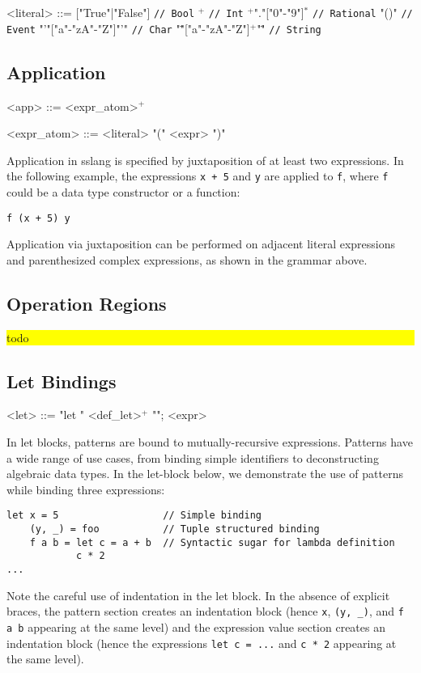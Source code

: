 \documentclass{article}
\newcommand{\fixme}[1]{
  \noindent\colorbox{yellow}{\parbox{\dimexpr\linewidth-2\fboxsep}{#1}}%
}
\begin{document}
\begin{grammar}
<literal> ::= ["True"|"False"] \texttt{// Bool}
\alt ["0"-"9"]$^{+}$ \texttt{// Int}
\alt ["0"-"9"]$^{+}$"."["0"-"9"]$^{*}$ \texttt{// Rational}
\alt "()" \texttt{// Event}
\alt "'"["a"-"zA"-"Z"]"'" \texttt{// Char}
\alt "\""["a"-"zA"-"Z"]$^{+}$"\"" \texttt{// String}
\end{grammar}
\subsection{Application}
\begin{grammar}
<app> ::= <expr_atom>$^{+}$

<expr_atom> ::= <literal>
\alt "(" <expr> ")"
\end{grammar}

Application in sslang is specified by juxtaposition of at least two expressions. In the following example, the expressions \texttt{x + 5} and \texttt{y} are applied to \texttt{f}, where \texttt{f} could be a data type constructor or a function:
\begin{lstlisting}
f (x + 5) y
\end{lstlisting}

Application via juxtaposition can be performed on adjacent literal expressions and parenthesized complex expressions, as shown in the grammar above.
\subsection{Operation Regions}
\fixme{todo}
\subsection{Let Bindings}
\begin{grammar}
<let> ::= "let {" <def_let>$^{+}$ "}"; <expr>
\end{grammar}

In let blocks, patterns are bound to mutually-recursive expressions. Patterns have a wide range of use cases, from binding simple identifiers to deconstructing algebraic data types. In the let-block below, we demonstrate the use of patterns while binding three expressions:
\begin{lstlisting}
let x = 5                  // Simple binding
    (y, _) = foo           // Tuple structured binding
    f a b = let c = a + b  // Syntactic sugar for lambda definition
            c * 2
...
\end{lstlisting}
Note the careful use of indentation in the let block. In the absence of explicit braces, the pattern section creates an indentation block (hence \texttt{x}, \texttt{(y, _)}, and \texttt{f a b} appearing at the same level) and the expression value section creates an indentation block (hence the expressions \texttt{let c = ...} and \texttt{c * 2} appearing at the same level).
\end{document}
